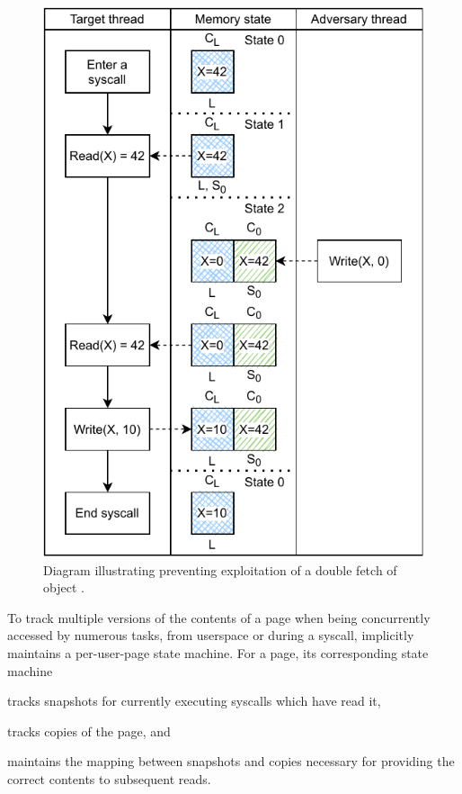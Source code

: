 \documentclass[letterpaper,twocolumn,10pt]{article}
\begin{document}
\begin{figure}[h]
  \centering
  \includegraphics[width=\linewidth]{img/doublefetch_tiktok.pdf}
  \caption{Diagram illustrating \tiktok preventing exploitation of a 
  double fetch of object .}
  \label{fig:doublefetch_tiktok}
\end{figure}

To track multiple versions of the contents of a page when being concurrently 
accessed by numerous tasks, from userspace or during a syscall,
\tiktok implicitly maintains a per-user-page state machine.
For a page, its corresponding state machine 
\begin{inparaenum}
  \item tracks snapshots for currently executing syscalls which have read it, 
  \item tracks copies of the page, and 
  \item maintains the mapping between snapshots and copies necessary for providing 
  the correct contents to subsequent reads. %
\end{inparaenum}
\end{document}
